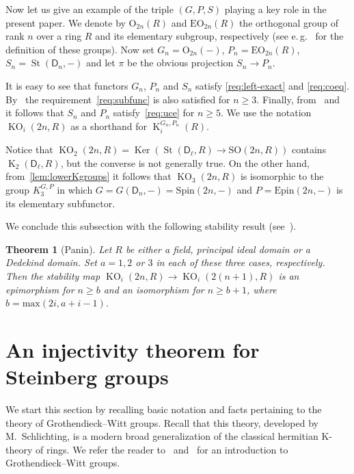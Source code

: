 \documentclass[oneside, 8pt]{amsart}
\newtheorem{externaltheorem}[lemma]{Theorem}
\theoremstyle{remark}
\theoremstyle{definition}
\numberwithin{lemma}{section}
\numberwithin{prop}{section}
\numberwithin{corollary}{section}
\numberwithin{externaltheorem}{section}
\DeclareMathOperator{\Ker}{Ker}
\DeclareMathOperator{\St}{St}
\DeclareMathOperator{\K}{K}
\DeclareMathOperator{\KO}{KO}
\newcommand{\rD}{\mathsf{D}}
\numberwithin{equation}{section}
\begin{document}
Now let us give an example of the triple $(G, P, S)$ playing a key role in the present paper.
We denote by $\mathrm{O}_{2n}(R)$ and $\mathrm{EO}_{2n}(R)$ the orthogonal group of rank $n$ over a ring $R$ and its elementary subgroup, respectively
 (see e.\,g.~\cite{Su82} for the definition of these groups).
Now set $G_n = \mathrm{O}_{2n}(-)$, $P_n = \mathrm{EO}_{2n}(R)$, $S_n = \St(\rD_n, -)$ and let $\pi$ be the obvious projection $S_n \to P_n$.

It is easy to see that functors $G_n$, $P_n$ and $S_n$ satisfy \ref{req:left-exact} and \ref{req:coeq}.
By~\cite{Su82} the requirement~\ref{req:subfunc} is also satisfied for $n \geq 3$.
Finally, from~\cite[Corollary~5.4]{St71} and~\cite[Theorem~1]{LS17} it follows that $S_n$ and $P_n$ satisfy~\ref{req:uce} for $n \geq 5$.
We use the notation $\KO_i(2n, R)$ as a shorthand for $\K_i^{G_n, P_n}(R)$. 

Notice that $\KO_2(2n, R) = \Ker(\St(\rD_\ell, R) \to \mathrm{SO}(2n, R))$ contains $\K_2(\rD_\ell, R)$, but the converse is not generally true. On the other hand, from~\cref{lem:lowerKgroups} it follows that $\KO_3(2n, R)$ is isomorphic to the group $K_3^{G, P}$ in which $G = G(\rD_n, -) = \mathrm{Spin}(2n, -)$ and $P = \mathrm{Epin}(2n, -)$ is its elementary subfunctor.

We conclude this subsection with the following stability result (see~\cite[Theorem~9.4]{Pa89}).
\begin{externaltheorem}[Panin] \label{Panin-stability}
 Let $R$ be either a field, principal ideal domain or a Dedekind domain. Set $a = 1,2$ or $3$ in each of these three cases, respectively.
 Then the stability map $\KO_i(2n, R) \to \KO_i(2(n+1), R)$ is an epimorphism for $n \geq b$ 
 and an isomorphism for $n \geq b + 1$, where $b = \mathrm{max}(2i, a+i-1)$. \end{externaltheorem}

\section{An injectivity theorem for Steinberg groups} \label{firstPart}
We start this section by recalling basic notation and facts pertaining to the theory of Grothendieck--Witt groups. Recall that this theory, developed by M.~Schlichting, is a modern broad generalization of the classical hermitian K-theory of rings. We refer the reader to~\cite[\S~2]{FRS12} and~\cite[\S~2]{AF17} for an introduction to Grothendieck--Witt groups.
\end{document}
